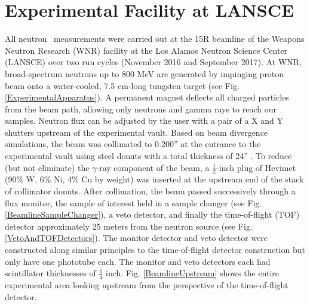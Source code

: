 \section{Experimental Facility at LANSCE}
All neutron \tot\ measurements were carried out at the 15R
beamline of the Weapons Neutron Research (WNR) facility at the Los Alamos
Neutron Science Center (LANSCE) over two run cycles (November 2016 and
September 2017). At WNR, broad-spectrum neutrons up
to 800 MeV are generated by impinging proton beam onto a water-cooled, 7.5
cm-long tungsten target (see Fig. \ref{ExperimentalApparatus}). A 
permanent magnet deflects all charged particles from the beam path, 
allowing only neutrons and gamma rays to reach our samples. Neutron flux can be
adjusted by the user with a pair of a X and Y shutters upstream of the
experimental vault. Based on beam divergence
simulations, the beam was collimated to 0.200'' at  the entrance to the
experimental vault using steel donuts with a total thickness of 24'' .
To reduce (but not eliminate) the $\gamma$-ray component of the beam,
a $\frac{1}{2}$-inch plug of Hevimet (90\% W, 6\% 
Ni, 4\% Cu by weight) was inserted at the upstream end of the
stack of collimator donuts. After collimation, the beam passed successively through a flux 
monitor, the sample of interest held in a sample changer (see Fig.
\ref{BeamlineSampleChanger}), a veto detector, and finally the 
time-of-flight (TOF) detector approximately 25 meters from the neutron source (see Fig.
\ref{VetoAndTOFDetectors}). The monitor detector and veto detector
were constructed along similar principles to the time-of-flight
detector construction but only have one phototube each. The monitor and
veto detectors each had scintillator thicknesses of $\frac{1}{4}$ inch.
Fig. \ref{BeamlineUpstream} 
shows the entire experimental area looking upstream from the perspective of the time-of-flight
detector.

